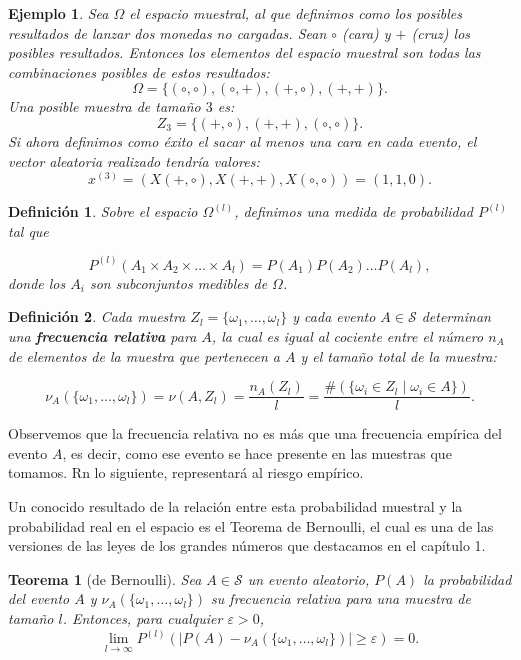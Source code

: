 \documentclass{report}
\newtheorem{thm}{Teorema}[section]
\newtheorem{dfn}{Definición}[section]
\newtheorem{ej}{Ejemplo}[section]
\begin{document}
\begin{ej}
    Sea $\Omega$ el espacio muestral, al que definimos como los posibles resultados de lanzar dos monedas no cargadas. Sean $\circ$ (cara) y $+$ (cruz)
    los posibles resultados. Entonces los elementos del espacio muestral son todas las combinaciones posibles de estos resultados:
    $$
        \Omega = \{(\circ,\circ), (\circ,+),(+,\circ),(+,+)\}.
    $$
    Una posible muestra de tamaño $3$ es:
    $$
        Z_{3} = \{(+,\circ),(+,+), (\circ,\circ)\}.
    $$
    Si ahora definimos como \emph{éxito} el sacar al menos una cara en cada evento, el vector aleatoria realizado tendría valores:
    $$
        x^{(3)} = (X(+,\circ), X(+,+), X(\circ,\circ)) = (1,1,0).
    $$
\end{ej}

\begin{dfn}
    Sobre el espacio \( \Omega^{(l)} \), definimos una medida de probabilidad \( P^{(l)} \) tal que

\begin{equation}\label{def: probabilidad en espacio muestral}
P^{(l)}(A_1\times A_2 \times\dots\times A_l) = P(A_1) P(A_2) \dots P(A_l),
\end{equation}
donde los \( A_i \) son subconjuntos medibles de \( \Omega \).\newline
\end{dfn}


\begin{dfn}
Cada muestra \( Z_l = \{\omega_1, \dots, \omega_l\} \) y cada evento \( A \in \mathcal{S} \) determinan 
una \textbf{frecuencia relativa} para \( A \), la cual es igual al cociente entre 
el número \( n_A \) de elementos de la muestra que pertenecen a \( A \) y el tamaño 
total de la muestra:

\[
\nu_A(\{\omega_1,\dots, \omega_l\}) = \nu(A,Z_l) = \frac{n_A(Z_l)}{l} = \frac{\#(\{ \omega_i \in Z_l \mid \omega_i \in A \})}{l}.
\]

\end{dfn}

Observemos que la frecuencia relativa no es más que una frecuencia empírica del evento $A$, es decir, como ese evento
se hace presente en las muestras que tomamos. Rn lo siguiente, representará al riesgo
empírico. 

Un conocido resultado de la relación entre esta probabilidad muestral y la probabilidad real en el espacio
es el Teorema de Bernoulli, el cual es una de las versiones de las leyes de los grandes números que destacamos en el capítulo 1.
\bigskip
\begin{thm}[de Bernoulli]
Sea \( A \in \mathcal{S} \) un evento aleatorio, $P(A)$ la probabilidad del evento $A$ y $\nu_A(\{\omega_1,\dots, \omega_l\})$ su frecuencia relativa para una muestra de
tamaño $l$. Entonces, para cualquier $\varepsilon > 0$,
\[
    \lim_{l\to\infty} P^{(l)}\left(| P(A)-\nu_A(\{\omega_1,\dots, \omega_l\})| \geq \varepsilon\right) = 0.
\]
\end{thm}
\end{document}
